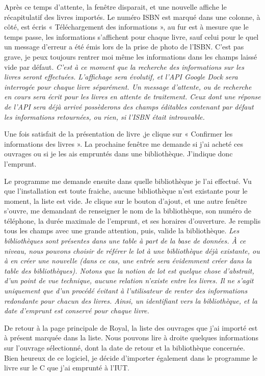 Après ce temps d'attente, la fenêtre disparait, et une nouvelle affiche le récapitulatif des livres importés.
Le numéro ISBN est marqué dans une colonne, à côté, est écris « Téléchargement des informations », au fur est à mesure que le temps passe, les informations s'affichent pour chaque livre, sauf celui pour le quel un message d'erreur a été émis lors de la prise de photo de l'ISBN. 
C'est pas grave, je peux toujours rentrer moi même les informations dans les champs laissé vide par défaut. 
\emph{C'est à ce moment que la recherche des informations sur les livres seront effectuées. 
	L'affichage sera évolutif, et l'API Google Dock sera interrogée pour chaque livre séparément. 
	Un message d'attente, ou de recherche en cours sera écrit pour les livres en attente de traitement. 
	Ceux dont une réponse de l'API sera déjà arrivé possèderons des champs éditables contenant par défaut les informations retournées, ou rien, si l'ISBN était introuvable. 
}

Une fois satisfait de la présentation de livre ,je clique sur « Confirmer les informations des livres ». 
La prochaine fenêtre me demande si j'ai acheté ces ouvrages ou si je les ais empruntés dans une bibliothèque. 
J'indique donc l'emprunt.

Le programme me demande ensuite dans quelle bibliothèque je l'ai effectué. 
Vu que l'installation est toute fraiche, aucune bibliothèque n'est existante pour le moment, la liste est vide.
Je clique sur le bouton d'ajout, et une autre fenêtre s'ouvre, me demandant de renseigner le nom de la bibliothèque, son numéro de téléphone, la durée maximale de l'emprunt, et ses horaires d'ouverture. 
Je remplis tous les champs avec une grande attention, puis, valide la bibliothèque. 
\emph{Les bibliothèques sont présentes dans une table à part de la base de données.
	À ce niveau, nous pouvons choisir de référer le lot à une bibliothèque déjà existante, ou à en créer une nouvelle
	(dans ce cas, une entrée sera évidemment créer dans la table des bibliothèques). 
	Notons que la notion de lot est quelque chose d'abstrait, d'un point de vue technique, aucune relation n'existe entre les livres.
	Il ne s'agit uniquement que d'un procédé évitant à l'utilisateur de renter des informations redondante pour chacun des livres.
	Ainsi, un identifiant vers la bibliothèque, et la date d'emprunt est conservé pour chaque livre.
}

De retour à la page principale de Royal, la liste des ouvrages que j'ai importé est à présent marquée dans la liste. 
Nous pouvons lire à droite quelques informations sur l'ouvrage sélectionné, dont la date de retour et la bibliothèque concernée. 
Bien heureux de ce logiciel, je décide d'importer également dans le programme le livre sur le C que j'ai emprunté à l'IUT. 

